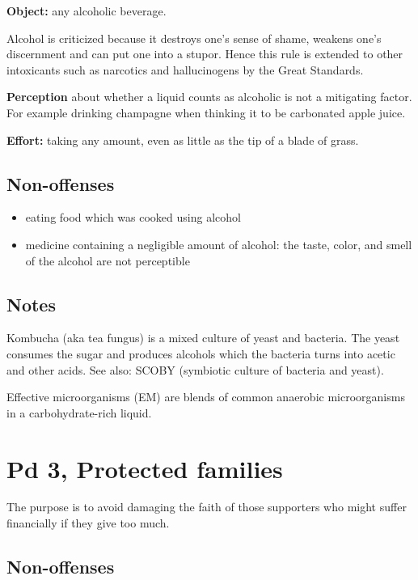 \textbf{Object:} any alcoholic beverage.

Alcohol is criticized because it destroys one's sense of shame, weakens
one's discernment and can put one into a stupor. Hence this rule is
extended to other intoxicants such as narcotics and hallucinogens by the
Great Standards.

\textbf{Perception} about whether a liquid counts as alcoholic is not a
mitigating factor. For example drinking champagne when thinking it to be
carbonated apple juice.

\textbf{Effort:} taking any amount, even as little as the tip of a blade
of grass.

\subsection{Non-offenses}

\begin{itemize}
\tightlist
\item
  eating food which was cooked using alcohol
\item
  medicine containing a negligible amount of alcohol: the taste, color,
  and smell of the alcohol are not perceptible
\end{itemize}

\subsection{Notes}

Kombucha (aka tea fungus) is a mixed culture of yeast and bacteria. The
yeast consumes the sugar and produces alcohols which the bacteria turns
into acetic and other acids. See also: SCOBY (symbiotic culture of
bacteria and yeast).

Effective microorganisms (EM) are blends of common anaerobic
microorganisms in a carbohydrate-rich liquid.

\clearpage

\section{Pd 3, Protected families}

The purpose is to avoid damaging the faith of those supporters who might
suffer financially if they give too much.

\subsection{Non-offenses}

